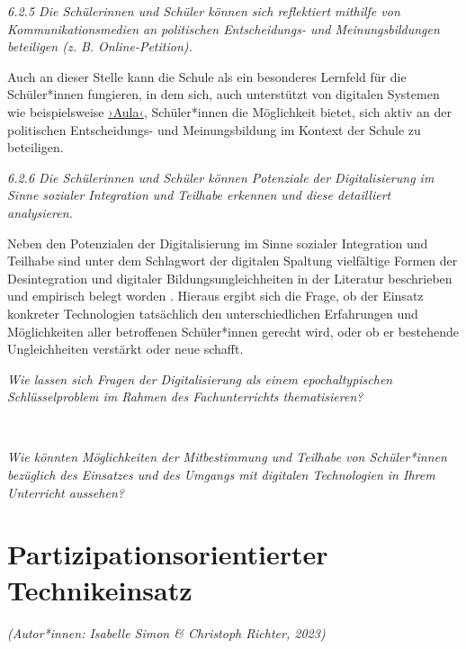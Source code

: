 \documentclass[
  a4paper,
]{book}
\begin{document}
{\emph{6.2.5 Die Schülerinnen und Schüler können sich reflektiert mithilfe von Kommunikationsmedien an politischen Entscheidungs- und Meinungsbildungen beteiligen (z. B. Online-Petition).}}

Auch an dieser Stelle kann die Schule als ein besonderes Lernfeld für die Schüler*innen fungieren, in dem sich, auch unterstützt von digitalen Systemen wie beispielsweise \href{https://www.aula.de/}{›Aula‹}, Schüler*innen die Möglichkeit bietet, sich aktiv an der politischen Entscheidungs- und Meinungsbildung im Kontext der Schule zu beteiligen.

{\emph{6.2.6 Die Schülerinnen und Schüler können Potenziale der Digitalisierung im Sinne sozialer Integration und Teilhabe erkennen und diese detailliert analysieren.}}

Neben den Potenzialen der Digitalisierung im Sinne sozialer Integration und Teilhabe sind unter dem Schlagwort der digitalen Spaltung vielfältige Formen der Desintegration und digitaler Bildungsungleichheiten in der Literatur beschrieben und empirisch belegt worden \citep{kutscherDiskussionsfelderMedienpaedagogikMedien2021, verstandigZeroLevelDigitalDivide2016}. Hieraus ergibt sich die Frage, ob der Einsatz konkreter Technologien tatsächlich den unterschiedlichen Erfahrungen und Möglichkeiten aller betroffenen Schüler*innen gerecht wird, oder ob er bestehende Ungleichheiten verstärkt oder neue schafft.

\begin{blackbox}
\emph{Wie lassen sich Fragen der Digitalisierung als einem epochaltypischen Schlüsselproblem im Rahmen des Fachunterrichts thematisieren?}

\end{blackbox}

~

\begin{blackbox}
\emph{Wie könnten Möglichkeiten der Mitbestimmung und Teilhabe von Schüler*innen bezüglich des Einsatzes und des Umgangs mit digitalen Technologien in Ihrem Unterricht aussehen?}

\end{blackbox}

\section{Partizipationsorientierter Technikeinsatz}\label{partizipationsorientierter-technikeinsatz}

\emph{(Autor*innen: Isabelle Simon \& Christoph Richter, 2023)}
\end{document}
